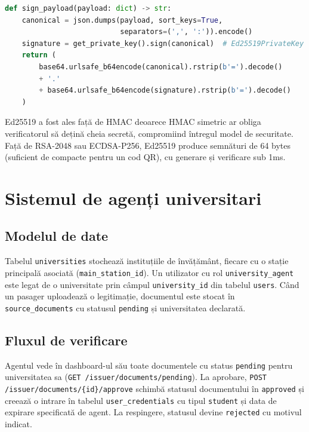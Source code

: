 \documentclass[12pt,a4paper]{report}
\begin{document}
\begin{lstlisting}[language=Python, caption=Semnare token card digital cu Ed25519]
def sign_payload(payload: dict) -> str:
    canonical = json.dumps(payload, sort_keys=True,
                           separators=(',', ':')).encode()
    signature = get_private_key().sign(canonical)  # Ed25519PrivateKey
    return (
        base64.urlsafe_b64encode(canonical).rstrip(b'=').decode()
        + '.'
        + base64.urlsafe_b64encode(signature).rstrip(b'=').decode()
    )
\end{lstlisting}

Ed25519 a fost ales față de HMAC deoarece HMAC simetric ar obliga verificatorul să dețină cheia secretă, compromiind întregul model de securitate. Față de RSA-2048 sau ECDSA-P256, Ed25519 produce semnături de 64 bytes (suficient de compacte pentru un cod QR), cu generare și verificare sub 1ms.

\section{Sistemul de agenți universitari}

\subsection{Modelul de date}

Tabelul \texttt{universities} stochează instituțiile de învățământ, fiecare cu o stație principală asociată (\texttt{main\_station\_id}). Un utilizator cu rol \texttt{university\_agent} este legat de o universitate prin câmpul \texttt{university\_id} din tabelul \texttt{users}. Când un pasager uploadează o legitimație, documentul este stocat în \texttt{source\_documents} cu statusul \texttt{pending} și universitatea declarată.

\subsection{Fluxul de verificare}

Agentul vede în dashboard-ul său toate documentele cu status \texttt{pending} pentru universitatea sa (\texttt{GET /issuer/documents/pending}). La aprobare, \texttt{POST /issuer/documents/\{id\}/approve} schimbă statusul documentului în \texttt{approved} și creează o intrare în tabelul \texttt{user\_credentials} cu tipul \texttt{student} și data de expirare specificată de agent. La respingere, statusul devine \texttt{rejected} cu motivul indicat.
\end{document}

